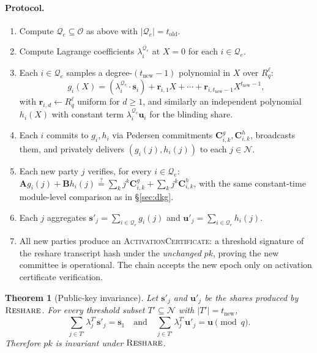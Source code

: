 \documentclass[11pt,a4paper]{article}
\newtheorem{theorem}{Theorem}
\theoremstyle{definition}
\theoremstyle{remark}
\newcommand{\Rq}{R_q}
\newcommand{\Reshare}{\textsc{Reshare}}
\begin{document}
\paragraph{Protocol.}
\begin{enumerate}[leftmargin=*, itemsep=0pt]
\item Compute $\mathcal{Q}_e \subseteq \mathcal{O}$ as above with
$|\mathcal{Q}_e| = t_{\mathrm{old}}$.
\item Compute Lagrange coefficients $\lambda_i^{\mathcal{Q}_e}$ at
$X = 0$ for each $i \in \mathcal{Q}_e$.
\item Each $i \in \mathcal{Q}_e$ samples a degree-$(t_{\mathrm{new}} - 1)$
polynomial in $X$ over $\Rq^\ell$:
\[
g_i(X) = (\lambda_i^{\mathcal{Q}_e} \cdot \mathbf{s}_i) + \mathbf{r}_{i,1} X + \cdots + \mathbf{r}_{i, t_{\mathrm{new}}-1} X^{t_{\mathrm{new}}-1},
\]
with $\mathbf{r}_{i,d} \gets \Rq^\ell$ uniform for $d \ge 1$, and
similarly an independent polynomial $h_i(X)$ with constant term
$\lambda_i^{\mathcal{Q}_e} \mathbf{u}_i$ for the blinding share.
\item Each $i$ commits to $g_i, h_i$ via Pedersen commitments
$\mathbf{C}^g_{i,k}, \mathbf{C}^h_{i,k}$, broadcasts them, and
privately delivers $(g_i(j), h_i(j))$ to each $j \in \mathcal{N}$.
\item Each new party $j$ verifies, for every $i \in \mathcal{Q}_e$:
$\mathbf{A} g_i(j) + \mathbf{B} h_i(j) \stackrel{?}{=}
\sum_k j^k \mathbf{C}^g_{i,k} + \sum_k j^k \mathbf{C}^h_{i,k}$, with
the same constant-time module-level comparison as in
\S\ref{sec:dkg}.
\item Each $j$ aggregates
$\mathbf{s}'_j = \sum_{i \in \mathcal{Q}_e} g_i(j)$ and
$\mathbf{u}'_j = \sum_{i \in \mathcal{Q}_e} h_i(j)$.
\item All new parties produce an \textsc{ActivationCertificate}: a
threshold signature of the reshare transcript hash under the
\emph{unchanged} $\mathit{pk}$, proving the new committee is
operational. The chain accepts the new epoch only on activation
certificate verification.
\end{enumerate}

\begin{theorem}[Public-key invariance]
\label{thm:reshare-pkinv}
Let $\mathbf{s}'_j$ and $\mathbf{u}'_j$ be the shares produced by
$\Reshare$. For every threshold subset
$T' \subseteq \mathcal{N}$ with $|T'| = t_{\mathrm{new}}$,
\[
\sum_{j \in T'} \lambda_j^{T'} \mathbf{s}'_j = \mathbf{s}_1 \quad\text{and}\quad
\sum_{j \in T'} \lambda_j^{T'} \mathbf{u}'_j = \mathbf{u} \pmod q.
\]
Therefore $\mathit{pk}$ is invariant under $\Reshare$.
\end{theorem}
\end{document}
